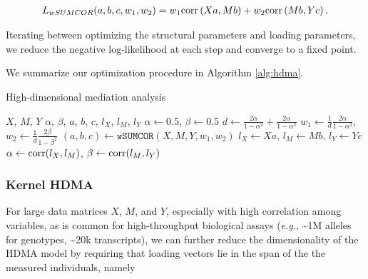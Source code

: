 \documentclass[
]{article}
\begin{document}
\begin{align}
L_{wSUMCOR}(a,b,c, w_1, w_2) = w_1 {\rm corr}\left(Xa, Mb\right) + w_2 {\rm corr}\left(Mb, Yc\right).
\end{align}

Iterating between optimizing the structural parameters and loading
parameters, we reduce the negative log-likelihood at each step and
converge to a fixed point.

We summarize our optimization procedure in Algorithm \ref{alg:hdma}.

\begin{algorithm}
\caption{High-dimensional mediation analysis}\label{alg:hdma}
\begin{algorithmic}
\Require $X$, $M$, $Y$ 
\Ensure $\alpha$, $\beta$, $a$, $b$, $c$, $l_X$, $l_M$, $l_Y$ 
\State $\alpha \gets 0.5$, $\beta \gets 0.5$ 
\State $d \gets \frac{2\alpha}{1-\alpha^2} + \frac{2\alpha}{1-\alpha^2}$ 
\State $w_1 \gets \frac{1}{d}\frac{2\alpha}{1-\alpha^2}$, $w_2 \gets \frac{1}{d}\frac{2\beta}{1-\beta^2}$ 
\State $(a,b,c) \gets \texttt{wSUMCOR}(X, M, Y, w_1, w_2)$  
\State $l_X \gets Xa$, $l_M \gets Mb$, $l_Y \gets Yc$ 
\State $\alpha \gets {\rm corr}(l_X, l_M)$, $\beta \gets {\rm corr}(l_M, l_Y)$ 
\EndWhile
\end{algorithmic}
\end{algorithm}

\subsubsection{Kernel HDMA}\label{kernel-hdma}

For large data matrices \(X\), \(M\), and \(Y\), especially with high
correlation among variables, as is common for high-throughput biological
assays (\textit{e.g.}, \textasciitilde1M alleles for genotypes,
\textasciitilde20k transcripts), we can further reduce the
dimensionality of the HDMA model by requiring that loading vectors lie
in the span of the the measured individuals, namely
\end{document}
